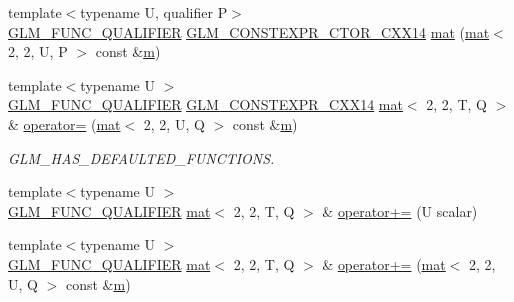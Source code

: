 \begin{DoxyCompactItemize}
\item 
{\footnotesize template$<$typename U, qualifier P$>$ }\\\mbox{\hyperlink{setup_8hpp_a33fdea6f91c5f834105f7415e2a64407}{G\+L\+M\+\_\+\+F\+U\+N\+C\+\_\+\+Q\+U\+A\+L\+I\+F\+I\+ER}} \mbox{\hyperlink{setup_8hpp_a0900f9145e68bf6061b6f5e7be3fa751}{G\+L\+M\+\_\+\+C\+O\+N\+S\+T\+E\+X\+P\+R\+\_\+\+C\+T\+O\+R\+\_\+\+C\+X\+X14}} \mbox{\hyperlink{structglm_1_1mat_3_012_00_012_00_01_t_00_01_q_01_4_a93387113fa262d6612cc51c980056241}{mat}} (\mbox{\hyperlink{structglm_1_1mat}{mat}}$<$ 2, 2, U, P $>$ const \&\mbox{\hyperlink{_s_d_l__opengl__glext_8h_af593500c283bf1a787a6f947f503a5c2}{m}})
\item 
{\footnotesize template$<$typename U $>$ }\\\mbox{\hyperlink{setup_8hpp_a33fdea6f91c5f834105f7415e2a64407}{G\+L\+M\+\_\+\+F\+U\+N\+C\+\_\+\+Q\+U\+A\+L\+I\+F\+I\+ER}} \mbox{\hyperlink{setup_8hpp_a4dd12abf5e1164bc57f3a34671d03844}{G\+L\+M\+\_\+\+C\+O\+N\+S\+T\+E\+X\+P\+R\+\_\+\+C\+X\+X14}} \mbox{\hyperlink{structglm_1_1mat}{mat}}$<$ 2, 2, T, Q $>$ \& \mbox{\hyperlink{structglm_1_1mat_3_012_00_012_00_01_t_00_01_q_01_4_a1819564bc86b8cc5a855482bdfcb88d7}{operator=}} (\mbox{\hyperlink{structglm_1_1mat}{mat}}$<$ 2, 2, U, Q $>$ const \&\mbox{\hyperlink{_s_d_l__opengl__glext_8h_af593500c283bf1a787a6f947f503a5c2}{m}})
\begin{DoxyCompactList}\small\item\em G\+L\+M\+\_\+\+H\+A\+S\+\_\+\+D\+E\+F\+A\+U\+L\+T\+E\+D\+\_\+\+F\+U\+N\+C\+T\+I\+O\+NS. \end{DoxyCompactList}\item 
{\footnotesize template$<$typename U $>$ }\\\mbox{\hyperlink{setup_8hpp_a33fdea6f91c5f834105f7415e2a64407}{G\+L\+M\+\_\+\+F\+U\+N\+C\+\_\+\+Q\+U\+A\+L\+I\+F\+I\+ER}} \mbox{\hyperlink{structglm_1_1mat}{mat}}$<$ 2, 2, T, Q $>$ \& \mbox{\hyperlink{structglm_1_1mat_3_012_00_012_00_01_t_00_01_q_01_4_a989c77fac3c3679eb4dd7fdece75d179}{operator+=}} (U scalar)
\item 
{\footnotesize template$<$typename U $>$ }\\\mbox{\hyperlink{setup_8hpp_a33fdea6f91c5f834105f7415e2a64407}{G\+L\+M\+\_\+\+F\+U\+N\+C\+\_\+\+Q\+U\+A\+L\+I\+F\+I\+ER}} \mbox{\hyperlink{structglm_1_1mat}{mat}}$<$ 2, 2, T, Q $>$ \& \mbox{\hyperlink{structglm_1_1mat_3_012_00_012_00_01_t_00_01_q_01_4_ac200613a912b6413704bf8aa5677825c}{operator+=}} (\mbox{\hyperlink{structglm_1_1mat}{mat}}$<$ 2, 2, U, Q $>$ const \&\mbox{\hyperlink{_s_d_l__opengl__glext_8h_af593500c283bf1a787a6f947f503a5c2}{m}})

\end{DoxyCompactItemize}
